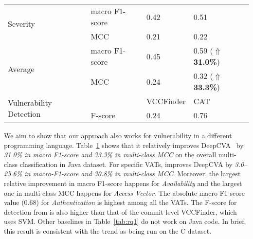 \begin{table}[t]
\begin{center}
\begin{tabular}{l|p{2.0cm}<{\centering}|p{1.6cm}<{\centering}|p{1.5cm}<{\centering}}
			\hline
			\multirow{2}{*}{Severity}        & macro F1-score                             &   0.42         & 0.51\\
			\cline{2-4}
			& MCC                                 &   0.21         & 0.22\\
			\hline
			\hline
			\multirow{2}{*}{Average}         & macro F1-score                             &    0.45        & 0.59 ($\Uparrow${\bf 31.0\%})\\
			\cline{2-4}
			& MCC                                 & 0.24           & 0.32 ($\Uparrow${\bf 33.3\%})\\
			\hline
                        \hline
\multirow{2}{*}{Vulnerability Detection} &  & VCCFinder & CAT \\
\cline{2-4}
 & F-score & 0.24 & 0.76 \\
\hline
		\end{tabular}
		\label{rq2_results}
	\end{center}
\end{table}

We aim to show that our approach also works for vulnerability in a
different programming language. Table~\ref{rq2_results} shows that it relatively
improves DeepCVA~\cite{deepCVA-ase21} by {\em 31.0\% in macro F1-score
and 33.3\% in multi-class MCC} on the overall multi-class
classification in Java dataset. For specific VATs, {\tool} improves
DeepCVA by {\em 3.0--25.6\% in macro-F1-score and 30.8\% in
multi-class MCC}. Moreover, the largest relative improvement in macro
F1-score happens for {\em Availability} and the largest one in
multi-class MCC happens for {\em Access Vector}.
The absolute macro F1-score value (0.68) for {\em Authentication} is
highest among all the VATs.
%
The F-score for detection from {\tool} is also higher than that of the
commit-level VCCFinder, which uses SVM. Other baselines in
Table~\ref{tab:rq1} do not work on Java code. In brief, this result is
consistent with the trend as {\tool} being run on the C dataset.



